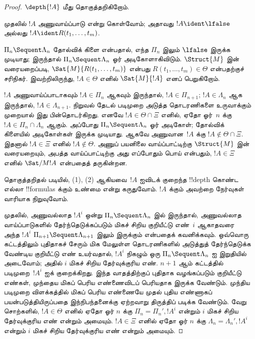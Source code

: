\documentclass[../../../include/open-logic-section]{subfiles}
\begin{document}
\begin{proof}
  $\depth{!A}$ மீது தொகுத்தறிகிறோம்.

முதலில் $!A$ அணுவாய்ப்பாடு என்று கொள்வோம்; அதாவது
$!A \ident \lfalse$ அல்லது $!A \ident R(t_1, \dots, t_m)$.

$\Pi_n \Sequent \Lambda_n$ தோல்விக் கிளை என்பதால்,
எந்த $\Pi_n$ இலும் $\lfalse$ இருக்க முடியாது; இருந்தால்
$\Pi_n \Sequent \Lambda_n$ ஓர் அடிகோளாகிவிடும்.
$\Struct{M}$ இன் வரையறைப்படி,
$\Sat{M}{R(t_1, \dots, t_m)}$ என்பது
$R(t_1, \dots, t_m) \in \Theta$ என்பதற்குச் சரிநிகர்.
இவற்றிலிருந்து, $!A \in \Theta$ எனில் $\Sat{M}{!A}$
எனப் பெறுகிறோம்.

$!A$ அணுவாய்ப்பாடாகவும் $!A \in \Pi_n$ ஆகவும் இருந்தால்,
$!A \in \Pi_{n+1}$; $!A \in \Lambda_n$ ஆக இருந்தால்,
$!A \in \Lambda_{n+1}$. நிறுவல் தேடல் படிமுறை
அடுத்த தொடரணிகளை உருவாக்கும் முறையால் இது பின்தொடர்கிறது.
எனவே $!A \in \Theta \cap \Xi$ எனில், ஏதோ ஓர்~$n$
க்கு $!A \in \Pi_n \cap \Lambda_n$ ஆகும். அப்போது
$\Pi_n \Sequent \Lambda_n$ ஓர் அடிகோள்; தோல்விக்
கிளையில் அடிகோள்கள் இருக்க முடியாது. ஆகவே அணுவான~$!A$
க்கு $!A \notin \Theta \cap \Xi$. இதனால்
$!A \in \Xi$ எனில் $!A \notin \Theta$.
அணுப் பயனிலை வாய்ப்பாட்டிற்கு $\Struct{M}$ இன் வரையறையும்,
அபத்த வாய்ப்பாட்டிற்கு அது எப்போதும் பொய் என்பதும்,
$!A \in \Xi$ எனில் $\Sat/{M}{!A}$ என்பதைத் தருகின்றன.

தொகுத்தறிதல் படியில், (1), (2) ஆகியவை~$!A$ ஐவிடக்
குறைந்த !!{depth} கொண்ட எல்லா !!{formula}s க்கும்
உண்மை என்று கருதுவோம். $!A$ க்கும் அவற்றை நேர்வுகள்
வாரியாக நிறுவுவோம்.

முதலில், அணுவல்லாத $!A^i$ ஒன்று
$\Pi_n \Sequent \Lambda_n$ இல் இருந்தால், அணுவல்லாத
வாய்ப்பாடுகளில் தேர்ந்தெடுக்கப்படும் மிகச் சிறிய குறியீட்டு
எண்~$i$ ஆகாதவரை அந்த $!A^i$
$\Pi_{n+1} \Sequent \Lambda_{n+1}$ இலும் இருக்கும்
என்பதைக் கவனிக்கவும். ஒவ்வொரு கட்டத்திலும் புதிதாகச் சேரும்
மிக மேலுள்ள தொடரணிகளில் அடுத்துத் தேர்ந்தெடுக்க வேண்டிய
குறியீட்டு எண் உயர்வதால், $!A^i$ நிகழும் ஒரு
$\Pi_n \Sequent \Lambda_n$ ஐ இறுதியில் அடைவோம்;
அதில் $i$ மிகச் சிறிய தேர்வுக்குரிய எண்.
$n+1$ ஆம் கட்டத்தில் படிமுறை~$!A^i$ ஐக் குறைக்கிறது.
இந்த வாதத்திற்குப் புதிதாக வழங்கப்படும் குறியீட்டு எண்கள்,
முந்தைய மிகப் பெரிய எண்ணைவிடப் பெரியதாக இருக்க வேண்டும்.
முந்திய படிமுறை விளக்கத்தில் மிகப் பெரிய எண்ணையே முதல்
புதிய எண்ணாகப் பயன்படுத்தியிருப்பதை இந்நிபந்தனைக்கு
ஏற்றவாறு திருத்திப் படிக்க வேண்டும்.
வேறு சொற்களில், $!A \in \Theta$ எனில் ஏதோ ஓர் $n$
க்கு $\Pi_n = \Pi_n', !A^i$ என்றும் $i$ மிகச் சிறிய
தேர்வுக்குரிய எண் என்றும் அமையும். $!A \in \Xi$
எனில் ஏதோ ஓர் $n$ க்கு
$\Lambda_n = \Lambda_n', !A^i$ என்றும் $i$ மிகச்
சிறிய தேர்வுக்குரிய எண் என்றும் அமையும்.


\end{proof}
\end{document}
